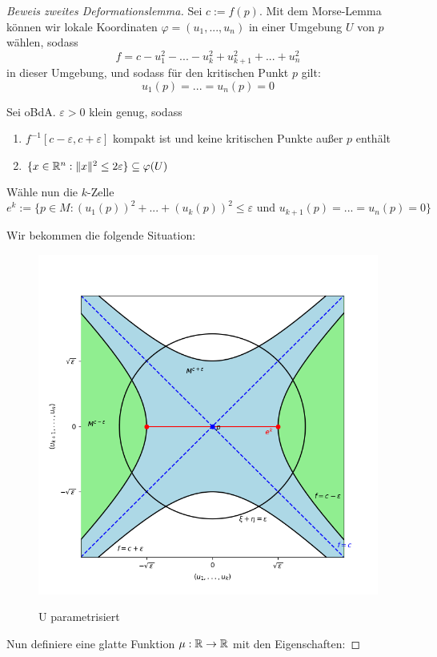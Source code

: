 \begin{proof}[Beweis zweites Deformationslemma]
    Sei $c := f(p)$. Mit dem Morse-Lemma können wir lokale Koordinaten 
    $\varphi = (u_1, ..., u_n)$ in einer Umgebung $U$ von $p$ wählen, sodass
    \[ f = c - u_1^2 - ... - u_k^2 + u_{k+1}^2 + ... + u_n^2 \]
    in dieser Umgebung, und sodass für den kritischen Punkt $p$ gilt:
    \[ u_1(p) = ... = u_n(p) = 0 \]

    Sei oBdA. $\varepsilon > 0$ klein genug, sodass 
    \begin{enumerate}
        \item $f^{-1}[c - \varepsilon, c + \varepsilon]$ kompakt ist und keine
            kritischen Punkte außer $p$ enthält
        \item $\{ x \in { \mathbb R }^n: \lVert x \rVert^2 \leq 2 \varepsilon \} \subseteq \varphi(U) $
    \end{enumerate}

    Wähle nun die $k$-Zelle 
    \[ 
        e^k := \{ p \in M: (u_1(p))^2 + ... + (u_k(p))^2 \leq \varepsilon 
        \text{ und } u_{k+1}(p) = ... = u_n(p) = 0 \} 
    \]

    Wir bekommen die folgende Situation:

    \begin{figure}[H]
        \centering
        \includegraphics[width=0.8\linewidth]{resources/Me-Diagram6-U-parameterized.png}
        \label{fig:me-diagram6}
        \caption{U parametrisiert}
    \end{figure}

    Nun definiere eine glatte Funktion $\mu: { \mathbb R } \to { \mathbb R }$ mit den Eigenschaften:


\end{proof}
